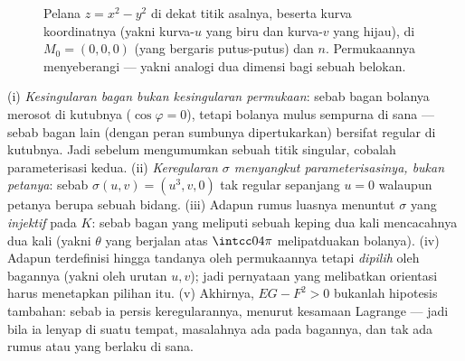\begin{figure}[ht]
\centering
{}
\caption{Pelana $z = x^2 - y^2$ di dekat titik asalnya, beserta
kurva koordinatnya (yakni kurva-$u$ yang biru dan kurva-$v$ yang hijau),
 di $M_0 = (0,0,0)$ (yang bergaris putus-putus) dan  $n$.
Permukaannya menyeberangi  --- yakni analogi
dua dimensi bagi sebuah belokan.}
\label{fig:b2:surfaces:saddle}
\end{figure}

\begin{remark}
(i) \emph{Kesingularan bagan bukan kesingularan permukaan}:
sebab bagan bolanya merosot di kutubnya
($\cos\varphi = 0$), tetapi bolanya mulus sempurna di sana
--- sebab bagan lain (dengan peran sumbunya dipertukarkan) bersifat regular
di kutubnya. Jadi sebelum mengumumkan sebuah titik singular, cobalah
parameterisasi kedua. (ii) \emph{Keregularan $\sigma$ menyangkut
parameterisasinya, bukan petanya}: sebab $\sigma(u, v) = (u^3, v,
0)$ tak regular sepanjang $u = 0$ walaupun petanya berupa sebuah
bidang. (iii) Adapun rumus luasnya menuntut $\sigma$ yang
\emph{injektif} pada $K$: sebab bagan yang meliputi sebuah keping dua kali
mencacahnya dua kali (yakni $\theta$ yang berjalan atas $\intcc0{4\pi}$
melipatduakan  bolanya). (iv) Adapun  terdefinisi
hingga tandanya oleh permukaannya tetapi \emph{dipilih} oleh bagannya
(yakni oleh urutan $u, v$); jadi pernyataan yang melibatkan orientasi harus menetapkan
pilihan itu. (v) Akhirnya, $EG - F^2 > 0$ bukanlah hipotesis
tambahan: sebab ia persis keregularannya, menurut kesamaan
Lagrange --- jadi bila ia lenyap di suatu tempat, masalahnya ada pada
bagannya, dan tak ada rumus  atau  yang berlaku di sana.
\end{remark}

